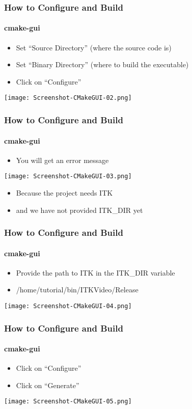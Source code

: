 \begin{frame}[fragile]
\frametitle{How to Configure and Build}
\framesubtitle{cmake-gui}
\begin{itemize}
\item Set ``Source Directory'' (where the source code is)
\item Set ``Binary Directory'' (where to build the executable)
\item Click on ``Configure''
\end{itemize}
\begin{center}
  \texttt{[image: Screenshot-CMakeGUI-02.png]}
\end{center}
\end{frame}

\begin{frame}[fragile]
\frametitle{How to Configure and Build}
\framesubtitle{cmake-gui}
\begin{itemize}
\item You will get an error message
\end{itemize}
\begin{center}
  \texttt{[image: Screenshot-CMakeGUI-03.png]}
\end{center}
\begin{itemize}
\item Because the project needs ITK
\item and we have not provided ITK\_DIR yet
\end{itemize}
\end{frame}


\begin{frame}[fragile]
\frametitle{How to Configure and Build}
\framesubtitle{cmake-gui}
\begin{itemize}
\item Provide the path to ITK in the ITK\_DIR variable
\item /home/tutorial/bin/ITKVideo/Release
\end{itemize}
\begin{center}
  \texttt{[image: Screenshot-CMakeGUI-04.png]}
\end{center}
\end{frame}

\begin{frame}[fragile]
\frametitle{How to Configure and Build}
\framesubtitle{cmake-gui}
\begin{itemize}
\item Click on ``Configure''
\item Click on ``Generate''
\end{itemize}
\begin{center}
  \texttt{[image: Screenshot-CMakeGUI-05.png]}
\end{center}
\end{frame}


